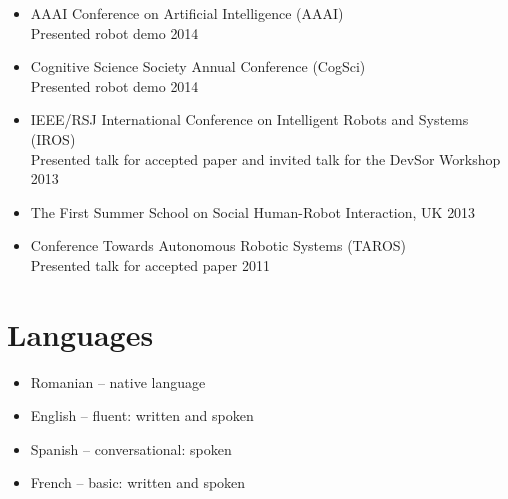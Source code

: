 \documentclass[10pt,letterpaper]{article}
\newcommand{\thing}[2]{{#1} \hfill {#2}}
\begin{document}
\begin{itemize}
\item \thing{AAAI Conference on Artificial Intelligence (AAAI)\\Presented robot demo}{2014}
\item \thing{Cognitive Science Society Annual Conference (CogSci)\\Presented robot demo}{2014}
\item \thing{IEEE/RSJ International Conference on Intelligent Robots and Systems (IROS)\\Presented talk for accepted paper and invited talk for the DevSor Workshop}{2013}
\item \thing{The First Summer School on Social Human-Robot Interaction, UK}{2013}
\item \thing{Conference Towards Autonomous Robotic Systems (TAROS)\\Presented talk for accepted paper}{2011}
\end{itemize}

\section{Languages}
\begin{itemize}%
\item Romanian -- native language
\item English -- fluent: written and spoken
\item Spanish -- conversational: spoken
\item French -- basic: written and spoken
\end{itemize}
\end{document}
